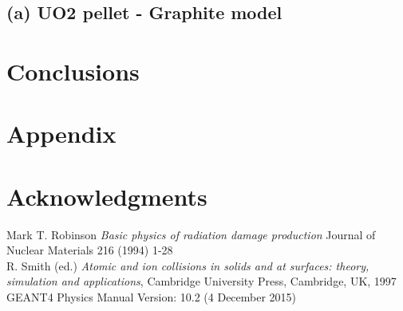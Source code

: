 \documentclass{anstrans}
\begin{document}
\subsection{(a) UO2 pellet - Graphite model}




\section{Conclusions}



\appendix
\section{Appendix}


\section{Acknowledgments}





\begin{thebibliography}{1}

 Mark T. Robinson {\em Basic physics of radiation damage production}
Journal of Nuclear Materials 216 (1994) 1-28 \\

 R. Smith (ed.) {\em Atomic and ion collisions in solids and at surfaces:
 theory, simulation and applications}, Cambridge University Press, Cambridge, UK,
  1997 \\

 GEANT4 Physics Manual Version: 10.2 (4 December 2015)

\end{thebibliography}
\end{document}
